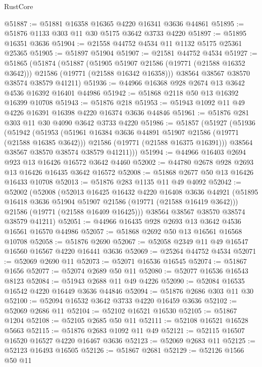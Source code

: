 \begin{lexlean}{RustCore}
\begin{coremodule}
@51887 := @51881 @16358 @16365 @4220 @16341 @3636 @44861
@51895 := @51876 @1133 @303 @11 @30 @5175 @3642 @3733 @4220
@51897 := @51895 @16351 @3636
@51904 := @21558 @44752 @4534 @11 @1132 @5175 @25361 @25365
@51905 := @51897 @51904
@51907 := @21581 @44752 @4534
@51927 := @51865
    (@51874
      (@51887
        (@51905 @51907 @21586 (@19771 (@21588 @16352 @3642)))
        @21586
        (@19771 (@21588 @16342 @16358)))
      @38564
      @38567
      @38570
      @38574
      @38579
      @41211)
@51936 := @44966 @16368 @928 @2674 @13 @3642 @4536 @16392 @16401 @44986
@51942 := @51868 @2118 @50 @13 @16392 @16399 @10708
@51943 := @51876 @218
@51953 := @51943 @1092 @11 @49 @4226 @16391 @16398 @4220 @16374 @3636 @44846
@51961 := @51876 @281 @303 @11 @30 @4090 @3642 @3733 @4220
@51986 := @51857
    (@51927
      (@51936
        (@51942
          (@51953
            (@51961 @16384 @3636 @44891 @51907 @21586 (@19771 (@21588 @16385 @3642)))
            @21586
            (@19771 (@21588 @16375 @16391)))
          @38564
          @38567
          @38570
          @38574
          @38579
          @41211)))
@51994 := @44966 @16403 @2694 @923 @13 @16426 @16572 @3642 @4460
@52002 := @44780 @2678 @928 @2693 @13 @16426 @16435 @3642 @16572
@52008 := @51868 @2677 @50 @13 @16426 @16433 @10708
@52013 := @51876 @283 @1135 @11 @49 @4092
@52042 := @52002
    (@52008
      (@52013
        @16425
        @16432
        @4220
        @16408
        @3636
        @44921
        (@51895 @16418 @3636 @51904 @51907 @21586 (@19771 (@21588 @16419 @3642)))
        @21586
        (@19771 (@21588 @16409 @16425)))
      @38564
      @38567
      @38570
      @38574
      @38579
      @41211)
@52051 := @44966 @16435 @928 @2693 @13 @3642 @4536 @16561 @16570 @44986
@52057 := @51868 @2692 @50 @13 @16561 @16568 @10708
@52058 := @51876 @2690
@52067 := @52058 @2349 @11 @49 @16547 @16560 @16567 @4220 @16441 @3636
@52069 := @25264 @44752 @4534
@52071 := @52069 @2690 @11
@52073 := @52071 @16536 @16545
@52074 := @51867 @1656
@52077 := @52074 @2689 @50 @11
@52080 := @52077 @16536 @16543 @8123
@52084 := @51943 @2688 @11 @49 @4226
@52090 := @52084 @16535 @16542 @4220 @16449 @3636 @44846
@52094 := @51876 @2686 @303 @11 @30
@52100 := @52094 @16532 @3642 @3733 @4220 @16459 @3636
@52102 := @52069 @2686 @11
@52104 := @52102 @16521 @16530
@52105 := @51867 @1204
@52108 := @52105 @2685 @50 @11
@52111 := @52108 @16521 @16528 @5663
@52115 := @51876 @2683 @1092 @11 @49
@52121 := @52115 @16507 @16520 @16527 @4220 @16467 @3636
@52123 := @52069 @2683 @11
@52125 := @52123 @16493 @16505
@52126 := @51867 @2681
@52129 := @52126 @1566 @50 @11

\end{coremodule}
\end{lexlean}
